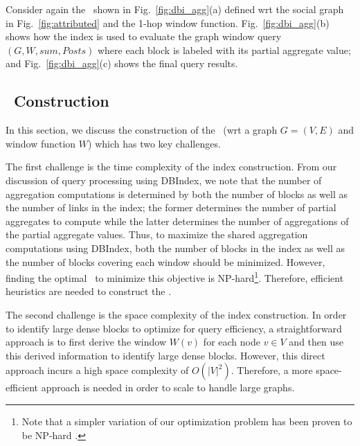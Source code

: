 Consider again the \DBIndex\ shown in Fig.~\ref{fig:dbi_agg}(a) 
defined wrt the social graph in Fig.~\ref{fig:attributed} and the 1-hop window function.
Fig.~\ref{fig:dbi_agg}(b) shows how the index is used to evaluate the graph window query $(G, W, sum, Posts)$
where each block is labeled with its partial aggregate value;
and
Fig.~\ref{fig:dbi_agg}(c) shows the final query results.





\subsection{\DBIndex\ Construction} 

In this section, we discuss the construction of the \DBIndex\ (wrt a graph $G=(V,E)$ and window function $W$) which has two key challenges.

The first challenge is the time complexity of the index construction. 
From our discussion of query processing using DBIndex, we note that the number of aggregation computations is determined by both the number of blocks as well as the number of links in the index; 
the former determines the number of partial aggregates to compute
while the latter determines the number of aggregations of the partial aggregate values.
Thus, to maximize the shared aggregation computations using DBIndex, both the number of blocks in the index as well as the number of blocks covering each window should be minimized. 
However, finding the optimal \DBIndex\ to minimize this objective is NP-hard\footnote{
Note that a simpler variation of our optimization problem has been proven to be NP-hard \cite{vassilevska2004finding}.}.
Therefore, efficient heuristics are needed to construct the \DBIndex.

The second challenge is the space complexity of the index construction.
In order to identify large dense blocks to optimize for query efficiency,
a straightforward approach  is to first derive the window $W(v)$ for each node $v \in V$ and
then use this derived information to identify large dense blocks.
However, this direct approach incurs a high space complexity of $O(|V|^2)$.
Therefore, a more space-efficient approach is needed in order to scale to handle large graphs.

